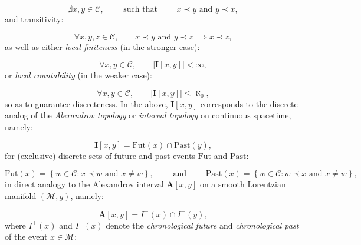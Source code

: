 \documentclass{article}
\begin{document}
\begin{equation}
\nexists x, y \in \mathcal{C}, \qquad \text{ such that } \qquad x \prec y \text{ and } y \prec x,
\end{equation}
and transitivity:

\begin{equation}
\forall x, y, z \in \mathcal{C}, \qquad x \prec y \text{ and } y \prec z \implies x \prec z,
\end{equation}
as well as either \textit{local finiteness} (in the stronger case):

\begin{equation}
\forall x, y \in \mathcal{C}, \qquad \left\lvert \mathbf{I} \left[ x, y \right] \right\rvert < \infty,
\end{equation}
or \textit{local countability} (in the weaker case):

\begin{equation}
\forall x, y \in \mathcal{C}, \qquad \left\lvert \mathbf{I} \left[ x, y \right] \right\rvert \leq \aleph_0,
\end{equation}
so as to guarantee discreteness. In the above, ${\mathbf{I} \left[ x, y \right]}$ corresponds to the discrete analog of the \textit{Alexandrov topology} or \textit{interval topology} on continuous spacetime, namely:

\begin{equation}
\mathbf{I} \left[ x, y \right] = \mathrm{Fut} \left( x \right) \cap \mathrm{Past} \left( y \right),
\end{equation}
for (exclusive) discrete sets of future and past events ${\mathrm{Fut}}$ and ${\mathrm{Past}}$:

\begin{equation}
\mathrm{Fut} \left( x \right) = \left\lbrace w \in \mathcal{C} : x \prec w \text{ and } x \neq w \right\rbrace, \qquad \text{ and } \qquad \mathrm{Past} \left( x \right) = \left\lbrace w \in \mathcal{C} : w \prec x \text{ and } x \neq w \right\rbrace,
\end{equation}
in direct analogy to the Alexandrov interval ${\mathbf{A} \left[ x, y \right]}$ on a smooth Lorentzian manifold ${\left( \mathcal{M}, g \right)}$, namely:

\begin{equation}
\mathbf{A} \left[ x, y \right] = I^{+} \left( x \right) \cap I^{-} \left( y \right),
\end{equation}
where ${I^{+} \left( x \right)}$ and ${I^{-} \left( x \right)}$ denote the \textit{chronological future} and \textit{chronological past} of the event ${x \in \mathcal{M}}$:
\end{document}
